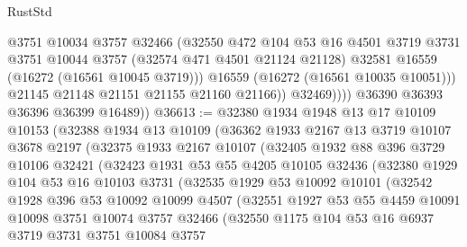 \begin{lexlean}{RustStd}
\begin{coremodule}
                      @3751
                      @10034
                      @3757
                      @32466
                      (@32550
                        @472
                        @104
                        @53
                        @16
                        @4501
                        @3719
                        @3731
                        @3751
                        @10044
                        @3757
                        (@32574 @471 @4501 @21124 @21128)
                        @32581
                        @16559
                        (@16272 (@16561 @10045 @3719)))
                      @16559
                      (@16272 (@16561 @10035 @10051)))
                    @21145
                    @21148
                    @21151
                    @21155
                    @21160
                    @21166))
                @32469))))
        @36390
        @36393
        @36396
        @36399
        @16489))
@36613 := @32380
    @1934
    @1948
    @13
    @17
    @10109
    @10153
    (@32388
      @1934
      @13
      @10109
      (@36362
        @1933
        @2167
        @13
        @3719
        @10107
        @3678
        @2197
        (@32375
          @1933
          @2167
          @10107
          (@32405
            @1932
            @88
            @396
            @3729
            @10106
            @32421
            (@32423
              @1931
              @53
              @55
              @4205
              @10105
              @32436
              (@32380
                @1929
                @104
                @53
                @16
                @10103
                @3731
                (@32535
                  @1929
                  @53
                  @10092
                  @10101
                  (@32542
                    @1928
                    @396
                    @53
                    @10092
                    @10099
                    @4507
                    (@32551
                      @1927
                      @53
                      @55
                      @4459
                      @10091
                      @10098
                      @3751
                      @10074
                      @3757
                      @32466
                      (@32550
                        @1175
                        @104
                        @53
                        @16
                        @6937
                        @3719
                        @3731
                        @3751
                        @10084
                        @3757

\end{coremodule}
\end{lexlean}
